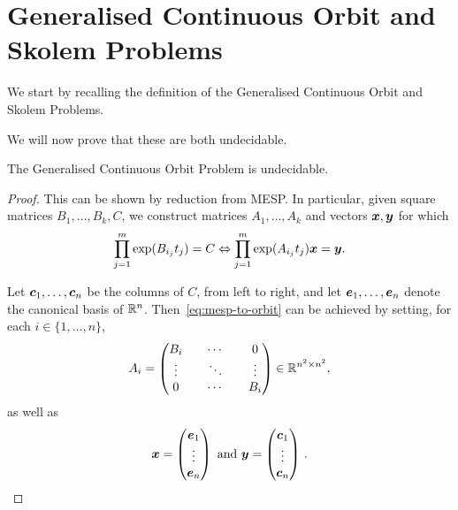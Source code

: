 \section{Generalised Continuous Orbit and Skolem Problems}

We start by recalling the definition of the Generalised Continuous Orbit and Skolem Problems.

\generalisedproblems*

We will now prove that these are both undecidable.

\begin{theorem}
The Generalised Continuous Orbit Problem is undecidable.
\end{theorem}

\begin{proof}
This can be shown by reduction from MESP. In particular, given square matrices $B_{1}, \ldots, B_{k}, C$, we construct matrices $A_{1}, \ldots, A_{k}$ and vectors $\boldsymbol{x}, \boldsymbol{y}$ for which
\begin{equation}
  \label{eq:mesp-to-orbit}
  \prod \limits_{j=1}^{m} \exp(B_{i_{j}} t_{j}) = C \Leftrightarrow
  \prod \limits_{j=1}^{m} \exp(A_{i_{j}} t_{j}) \myvector{x} = \myvector{y} .
\end{equation}

Let $\boldsymbol{c}_{1}, \ldots, \boldsymbol{c}_{n}$ be the columns of $C$, from left to right, and let $\boldsymbol{e}_{1}, \ldots, \boldsymbol{e}_{n}$ denote the canonical basis of $\mathbb{R}^{n}$. Then~\eqref{eq:mesp-to-orbit} can be achieved by setting, for each $i \in \lbrace 1, \ldots, n \rbrace$,
\begin{equation*}
A_{i} =
\begin{pmatrix}
B_{i} && \cdots && 0 \\
\vdots && \ddots && \vdots \\
0 && \cdots && B_{i}
\end{pmatrix} \in \mathbb{R}^{n^{2} \times n^{2}},
\end{equation*}
as well as
\begin{equation*}
\boldsymbol{x} = \begin{pmatrix} \boldsymbol{e}_{1} \\ \vdots \\ \boldsymbol{e}_{n} \end{pmatrix} \mbox{ and }
\boldsymbol{y} = \begin{pmatrix} \boldsymbol{c}_{1} \\ \vdots \\ \boldsymbol{c}_{n} \end{pmatrix} \, .
\end{equation*}
\end{proof}

